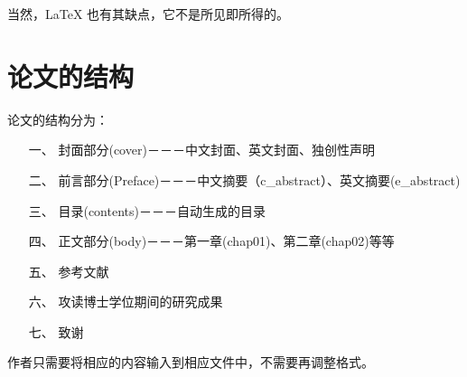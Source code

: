 \documentclass [12pt,a4paper,openany,twoside] {article}
\begin{document}
\begin{CJK*}{UTF8}{song}
当然，\LaTeX{} 也有其缺点，它不是所见即所得的。
\section{论文的结构}
论文的结构分为：
\begin{itemize}
    \item[一、] 封面部分(cover)－－－中文封面、英文封面、独创性声明
    \item[二、] 前言部分(Preface)－－－中文摘要（c\_abstract）、英文摘要(e\_abstract)
    \item[三、] 目录(contents)－－－自动生成的目录
    \item[四、] 正文部分(body)－－－第一章(chap01)、第二章(chap02)等等
    \item[五、] 参考文献
    \item[六、] 攻读博士学位期间的研究成果
    \item[七、] 致谢
\end{itemize}
作者只需要将相应的内容输入到相应文件中，不需要再调整格式。

\clearpage
\end{CJK*}
\end{document}
